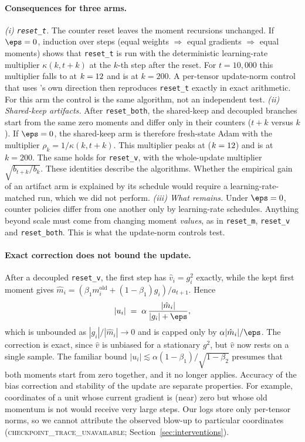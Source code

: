 \paragraph{Consequences for three arms.}
\emph{(i) \texttt{reset\_t}.} The counter reset leaves the moment recursions unchanged. If $\eps=0$,
induction over steps (equal weights $\Rightarrow$ equal gradients $\Rightarrow$ equal moments) shows that
\texttt{reset\_t} is \keep{} run with the deterministic learning-rate multiplier
$\kappa(k,t{+}k)$ at the $k$-th step after the reset. For $t=10{,}000$ this multiplier falls to
\SchedKappaMin{} at $k=12$ and is \SchedKappaEnd{} at $k=200$. A per-tensor update-norm control that uses \keep's
own direction then reproduces \texttt{reset\_t} exactly in exact arithmetic. For this arm the control is
the same algorithm, not an independent test.
\emph{(ii) Shared-keep artifacts.} After \texttt{reset\_both}, the shared-keep and decoupled branches
start from the same zero moments and differ only in their counters ($t{+}k$ versus $k$). If $\eps=0$,
the shared-keep arm is therefore fresh-state Adam with the multiplier $\rho_k=1/\kappa(k,t{+}k)$. This
multiplier peaks at \SchedRhoMax{} ($k=12$) and is \SchedRhoEnd{} at $k=200$. The
same holds for \texttt{reset\_v}, with the whole-update multiplier $\sqrt{b_{t+k}/b_k}$. These
identities describe the algorithms. Whether the empirical gain of an artifact arm is explained by its
schedule would require a learning-rate-matched run, which we did not perform.
\emph{(iii) What remains.} Under $\eps=0$, counter policies differ from one another only by learning-rate
schedules. Anything beyond scale must come from changing moment \emph{values}, as in \texttt{reset\_m},
\texttt{reset\_v} and \texttt{reset\_both}. This is what the update-norm controls test.

\paragraph{Exact correction does not bound the update.}
After a decoupled \texttt{reset\_v}, the first step has $\hat v_i=g_i^2$ exactly, while the kept first
moment gives $\hat m_i=(\beta_1 m_i^{\text{old}}+(1-\beta_1)g_i)/a_{t+1}$. Hence
\begin{equation}
|u_i| \;=\; \alpha\,\frac{|\hat m_i|}{|g_i|+\eps},
\label{eq:resetv}
\end{equation}
which is unbounded as $|g_i|/|\hat m_i|\to0$ and is capped only by $\alpha|\hat m_i|/\eps$. The
correction is exact, since $\hat v$ is unbiased for a stationary $g^2$, but $\hat v$ now rests on a single
sample. The familiar bound $|u_i|\lesssim\alpha(1-\beta_1)/\sqrt{1-\beta_2}$ \citep{kingma2015adam}
presumes that both moments start from zero together, and it no longer applies. Accuracy of the bias
correction and stability of the update are separate properties. For example, coordinates of a unit whose
current gradient is (near) zero but whose old momentum is not would receive very large steps. Our logs
store only per-tensor norms, so we cannot attribute the observed blow-up to particular coordinates
(\textsc{checkpoint\_trace\_unavailable}; Section~\ref{sec:interventions}).
